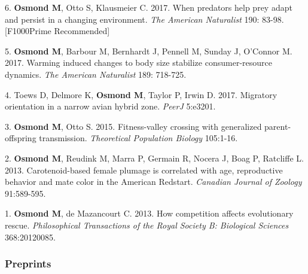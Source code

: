 \documentclass[12pt]{article}
\begin{document}
\noindent\hspace{.1cm}6. \textbf{Osmond M}, Otto S, Klausmeier C. 2017. When predators help prey adapt and persist in a changing environment. \textit{The American Naturalist} 190: 83-98. [F1000Prime Recommended]

\noindent\hspace{.1cm}5. \textbf{Osmond M}, Barbour M, Bernhardt J, Pennell M, Sunday J, O'Connor M. 2017. Warming induced changes to body size stabilize consumer-resource dynamics. \textit{The American Naturalist} 189: 718-725.

\noindent\hspace{.1cm}4. Toews D, Delmore K, \textbf{Osmond M}, Taylor P, Irwin D. 2017. Migratory orientation in a narrow avian hybrid zone. \textit{PeerJ} 5:e3201.

\noindent\hspace{.1cm}3. \textbf{Osmond M}, Otto S. 2015. Fitness-valley crossing with generalized parent-offspring transmission. \textit{Theoretical Population Biology} 105:1-16. %

\noindent\hspace{.1cm}2. \textbf{Osmond M}, Reudink M, Marra P, Germain R, Nocera J,  Boag P, Ratcliffe L.  2013. Carotenoid-based female plumage is correlated with age,
reproductive behavior and mate color in the American Redstart. \textit{Canadian Journal of Zoology} 91:589-595. %

\noindent\hspace{.1cm}1. \textbf{Osmond M}, de Mazancourt C. 2013. How competition affects evolutionary rescue. \textit{Philosophical Transactions of the Royal Society B: Biological Sciences} 368:20120085. %

%

\subsubsection*{Preprints}
\end{document}
